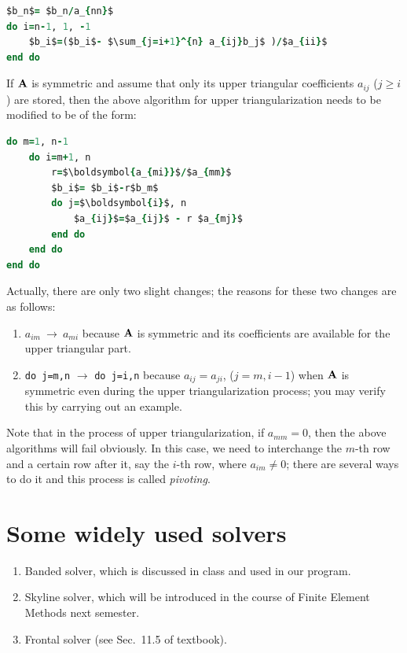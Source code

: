 \begin{lstlisting}[language=Fortran,numbers=none,basicstyle=\small\ttfamily\itshape,mathescape=true]
$b_n$= $b_n/a_{nn}$
do i=n-1, 1, -1
    $b_i$=($b_i$- $\sum_{j=i+1}^{n} a_{ij}b_j$ )/$a_{ii}$
end do
\end{lstlisting}

If $\mathbf{A}$ is symmetric and assume that only its upper triangular coefficients $a_{ij}$ ($j\geq i$) are stored, then the above algorithm for upper triangularization needs to be modified to be of the form:
\begin{lstlisting}[language=Fortran,numbers=none,basicstyle=\small\ttfamily\itshape,mathescape=true]
do m=1, n-1
    do i=m+1, n
        r=$\boldsymbol{a_{mi}}$/$a_{mm}$
        $b_i$= $b_i$-r$b_m$
        do j=$\boldsymbol{i}$, n
            $a_{ij}$=$a_{ij}$ - r $a_{mj}$
        end do
    end do
end do
\end{lstlisting}
Actually, there are only two slight changes; the reasons for these two changes are as follows:
\begin{enumerate}
  \item $a_{im}\ \rightarrow\ a_{mi}$ because $\mathbf{A}$ is symmetric and its coefficients are available for the upper triangular part.
  \item \texttt{do j=m,n} $\rightarrow$ \texttt{do j=i,n} because $a_{ij} = a_{ji}$, ($j = m, i-1$) when $\mathbf{A}$ is symmetric even during the upper triangularization process; you may verify this by carrying out an example.
\end{enumerate}
Note that in the process of upper triangularization, if $a_{mm} = 0$, then the above algorithms will fail obviously. In this case, we need to interchange the $m$-th row and a certain row after it, say the $i$-th row, where $a_{im}\neq 0$; there are several ways to do it and this process is called \emph{pivoting}.

\section{Some widely used solvers}
\begin{enumerate}
  \item Banded solver, which is discussed in class and used in our program.
  \item Skyline solver, which will be introduced in the course of Finite Element Methods next semester.
  \item Frontal solver (see Sec.~11.5 of textbook).
\end{enumerate}

